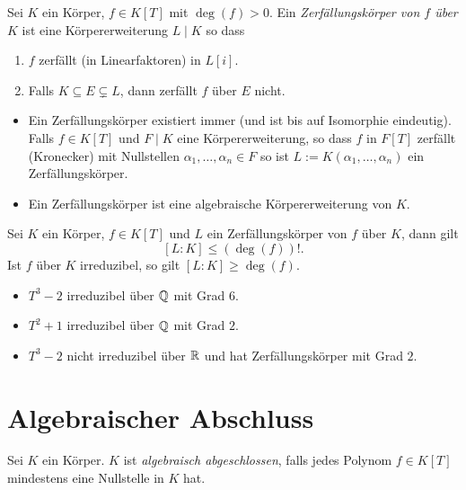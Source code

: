 \begin{definition}
	Sei $K$ ein Körper, $f \in K[T]$ mit $\deg(f) > 0$.
	Ein \emph{Zerfällungskörper von $f$ über $K$ } ist eine Körpererweiterung $L \mid K$ so dass
	\begin{enumerate}[1)]
		\item $f$ zerfällt (in Linearfaktoren) in $L[i]$.
		\item Falls $K \subseteq E \subsetneq L$, dann zerfällt $f$ über $E$ nicht.
	\end{enumerate}
\end{definition}

\begin{remark}
	\begin{itemize}
		\item Ein Zerfällungskörper existiert immer (und ist bis auf Isomorphie eindeutig).
			Falls $f \in K[T]$ und $F \mid K$ eine Körpererweiterung, so dass $f$ in $F[T]$ zerfällt (Kronecker)
			mit Nullstellen $\alpha_1,\ldots,\alpha_{n} \in F$ so ist $L := K(\alpha_1,\ldots,\alpha_{n})$ ein Zerfällungskörper.
		\item Ein Zerfällungskörper ist eine algebraische Körpererweiterung von $K$.
	\end{itemize}
\end{remark}


\begin{remark}
	Sei $K$ ein Körper, $f \in K[T]$ und $L$ ein Zerfällungskörper von $f$ über $K$, dann gilt
	\[
		[L:K] \leq (\deg(f))!
	.\]
	Ist $f$ über $K$ irreduzibel, so gilt $[L:K] \geq \deg(f)$.
	\begin{itemize}
		\item $T^3-2$ irreduzibel über $\mathbb{Q}$ mit Grad $6$.
		\item $T^2+1$ irreduzibel über $\mathbb{Q}$ mit Grad $2$.
		\item $T^3-2$ nicht irreduzibel über $\mathbb{R}$ und hat Zerfällungskörper mit Grad $2$.
	\end{itemize}
\end{remark}

\section{Algebraischer Abschluss}
\begin{definition}
	Sei $K$ ein Körper. $K$ ist \emph{algebraisch abgeschlossen}, falls jedes Polynom $f \in K[T]$ 
	mindestens eine Nullstelle in $K$ hat.
\end{definition}

